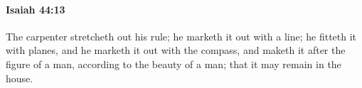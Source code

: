 
		\paragraph{Isaiah 44:13} %
			\label{ISAIAH-44-13}

			The carpenter stretcheth out his rule; he marketh it out with a line; he fitteth it with planes, and he marketh it out with the compass, and maketh it after the figure of a man, according to the beauty of a man; that it may remain in the house.


